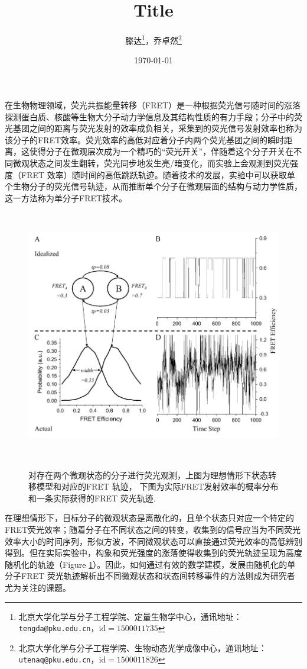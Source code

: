 \documentclass[11pt, a4paper]{article}
\begin{document}
\title{Title}
\author{滕达\footnote{北京大学化学与分子工程学院、定量生物学中心，通讯地址：\texttt{tengda@pku.edu.cn}，$\mathrm{id}=1500011735$}，乔卓然\footnote{北京大学化学与分子工程学院、生物动态光学成像中心，通讯地址：\texttt{utenaq@pku.edu.cn}，$\mathrm{id}=1500011826$}}
\date{\today}


在生物物理领域，荧光共振能量转移（FRET）是一种根据荧光信号随时间的涨落探测蛋白质、核酸等生物大分子动力学信息及其结构性质的有力手段；分子中的荧光基团之间的距离与荧光发射的效率成负相关，采集到的荧光信号发射效率也称为该分子的FRET效率。荧光效率的高低对应着分子内两个荧光基团之间的瞬时距离，这使得分子在微观层次成为一个精巧的“荧光开关”，伴随着这个分子开关在不同微观状态之间发生翻转，荧光同步地发生亮/暗变化，而实验上会观测到荧光强度（FRET 效率）随时间的高低跳跃轨迹。随着技术的发展，实验中可以获取单个生物分子的荧光信号轨迹，从而推断单个分子在微观层面的结构与动力学性质，这一方法称为单分子FRET技术。
\begin{figure}[htb]
  \centering
  \includegraphics[height=11cm]{Fig_trace.PNG}\\
  \caption{对存在两个微观状态的分子进行荧光观测，上图为理想情形下状态转移模型和对应的FRET 轨迹， 下图为实际FRET发射效率的概率分布和一条实际获得的FRET 荧光轨迹.}
  \label{fig:trace}
\end{figure}

在理想情形下，目标分子的微观状态是离散化的，且单个状态只对应一个特定的FRET荧光效率；随着分子在不同状态之间的转变，收集到的信号应当为不同荧光效率大小的时间序列，形似方波，不同微观状态可以直接通过荧光效率的高低辨别得到。但在实际实验中，构象和荧光强度的涨落使得收集到的荧光轨迹呈现为高度随机化的轨迹（Figure \ref{fig:trace}）。因此，如何通过有效的数学建模，发展由随机化的单分子FRET 荧光轨迹解析出不同微观状态和状态间转移事件的方法则成为研究者尤为关注的课题。
\end{document}
